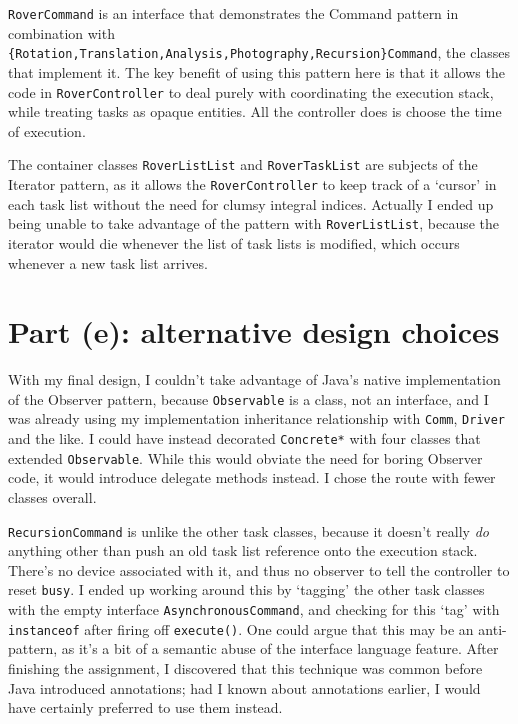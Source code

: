 \documentclass[a4paper,titlepage,12pt]{article}
\begin{document}
\texttt{RoverCommand} is an interface that demonstrates the Command
pattern in combination with
\texttt{\{Rotation,Translation,Analysis,Photography,Recursion\}Command},
the classes that implement it. The key benefit of using this pattern
here is that it allows the code in \texttt{RoverController} to deal
purely with coordinating the execution stack, while treating tasks as
opaque entities. All the controller does is choose the time of
execution.

The container classes \texttt{RoverListList} and \texttt{RoverTaskList}
are subjects of the Iterator pattern, as it allows the
\texttt{RoverController} to keep track of a `cursor' in each task list
without the need for clumsy integral indices. Actually I ended up being
unable to take advantage of the pattern with \texttt{RoverListList},
because the iterator would die whenever the list of task lists is
modified, which occurs whenever a new task list arrives.

\section{Part (e): alternative design choices}

With my final design, I couldn't take advantage of Java's native
implementation of the Observer pattern, because \texttt{Observable}
is a class, not an interface, and I was already using my implementation
inheritance relationship with \texttt{Comm}, \texttt{Driver} and the
like. I could have instead decorated \texttt{Concrete*} with four
classes that extended \texttt{Observable}. While this would obviate the
need for boring Observer code, it would introduce delegate methods
instead. I chose the route with fewer classes overall.

\texttt{RecursionCommand} is unlike the other task classes, because it
doesn't really \textit{do} anything other than push an old task list
reference onto the execution stack. There's no device associated with
it, and thus no observer to tell the controller to reset \texttt{busy}.
I ended up working around this by `tagging' the other task classes with
the empty interface \texttt{AsynchronousCommand}, and checking for this
`tag' with \texttt{instanceof} after firing off \texttt{execute()}. One
could argue that this may be an anti-pattern, as it's a bit of a
semantic abuse of the interface language feature. After finishing the
assignment, I discovered that this technique was common before Java
introduced annotations; had I known about annotations earlier, I would
have certainly preferred to use them instead.
\end{document}
